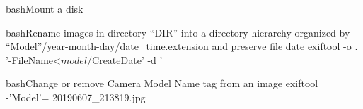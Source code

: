 \documentclass[10pt,a4paper]{article}
\begin{document}
\begin{multicols}{3}
\begin{codebox}{bash}{Mount a disk}
\end{codebox}

\begin{codebox}{bash}{Rename images in directory ``DIR'' into a directory hierarchy organized by ``Model''/year-month-day/date\_time.extension and preserve file date}
exiftool -o . '-FileName<${model}/${CreateDate}' -d '%

\end{codebox}

\begin{codebox}{bash}{Change or remove Camera Model Name tag from an image}
exiftool -'Model'= 20190607_213819.jpg

\end{codebox}


\AtNextBibliography{\footnotesize}
\printbibliography  
\end{multicols}
\end{document}
